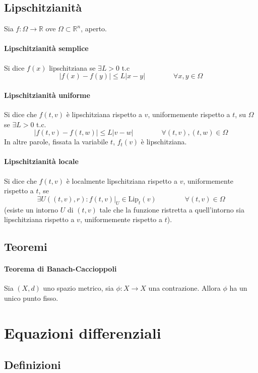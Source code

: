 \documentclass[a4paper,12pt]{article}
\begin{document}
\subsection{Lipschitzianità}
Sia $f:\Omega\rightarrow\mathbb{R}$ ove $\Omega\subset\mathbb{R}^n$, aperto.
\paragraph{Lipschitzianità semplice}
Si dice $f\left(x\right)$ lipschitziana se $\exists L>0$ t.c
$$ |f\left(x\right)- f\left(y\right)| \leq L|x-y|\qquad\qquad\forall x,y \in \Omega $$

\paragraph{Lipschitzianità uniforme}
Si dice che $f(t, v)$ è lipschitziana rispetto a $v$, uniformemente rispetto a $t$, su $\Omega$ se $\exists L>0$ t.c.
$$|f(t, v) - f(t, w)| \leq L|v-w|\qquad\qquad\forall (t,v), (t, w) \in \Omega$$
In altre parole, fissata la variabile $t$, $f_t(v)$ è lipschitziana.

\paragraph{Lipschitzianità locale}
Si dice che $f(t, v)$ è localmente lipschitziana rispetto a $v$, uniformemente rispetto a $t$, se
$$\exists U((t, v), r) : f(t, v)|_U \in \text{Lip}_t(v)\qquad\qquad\forall(t, v)\in \Omega$$
(esiste un intorno $U$ di $(t, v)$ tale che la funzione ristretta a quell'intorno sia lipschitziana rispetto a $v$, uniformemente rispetto a $t$).

\subsection{Teoremi}
\paragraph{Teorema di Banach-Caccioppoli}
Sia $(X, d)$ uno spazio metrico, sia $\phi : X\rightarrow X$ una contrazione.
Allora $\phi$ ha un unico punto fisso.


\section{Equazioni differenziali}

\subsection{Definizioni}
\end{document}
